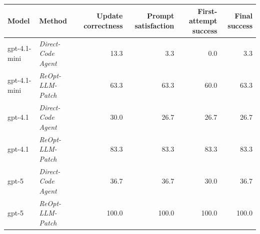 \begin{tabular}{llrrrr}
\toprule
\textbf{Model} & \textbf{Method} & \textbf{Update correctness} & \textbf{Prompt satisfaction} & \textbf{First-attempt success} & \textbf{Final success} \\
\midrule
gpt-4.1-mini & \emph{Direct-Code Agent} & 13.3 & 3.3 & 0.0 & 3.3 \\
gpt-4.1-mini & \emph{ReOpt-LLM-Patch} & 63.3 & 63.3 & 60.0 & 63.3 \\
\addlinespace
gpt-4.1 & \emph{Direct-Code Agent} & 30.0 & 26.7 & 26.7 & 26.7 \\
gpt-4.1 & \emph{ReOpt-LLM-Patch} & 83.3 & 83.3 & 83.3 & 83.3 \\
\addlinespace
gpt-5 & \emph{Direct-Code Agent} & 36.7 & 36.7 & 30.0 & 36.7 \\
gpt-5 & \emph{ReOpt-LLM-Patch} & 100.0 & 100.0 & 100.0 & 100.0 \\
\bottomrule
\end{tabular}
